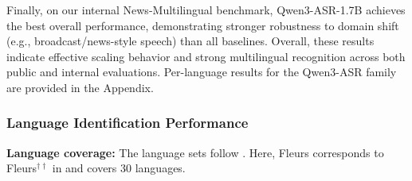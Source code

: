 Finally, on our internal News-Multilingual benchmark, Qwen3-ASR-1.7B achieves the best overall performance, demonstrating stronger robustness to domain shift (e.g., broadcast/news-style speech) than all baselines. Overall, these results indicate effective scaling behavior and strong multilingual recognition across both public and internal evaluations. Per-language results for the Qwen3-ASR family are provided in the Appendix.


\subsubsection{Language Identification Performance}

\begin{table}[h]
\centering
\caption{\textbf{Language identification accuracy~(\%) $\uparrow$ on open-source multilingual test sets.}}
\vspace{-0.1in}
\label{tab:langid_fleurs_cv}

\begin{threeparttable}

\begin{tablenotes}[flushleft]
\footnotesize
\begin{minipage}{\textwidth}
\item \textbf{Language coverage:} The language sets follow . Here, Fleurs corresponds to Fleurs$^{\dagger\dagger}$ in  and covers 30 languages.
\end{minipage}
\end{tablenotes}

\end{threeparttable}
\end{table}

